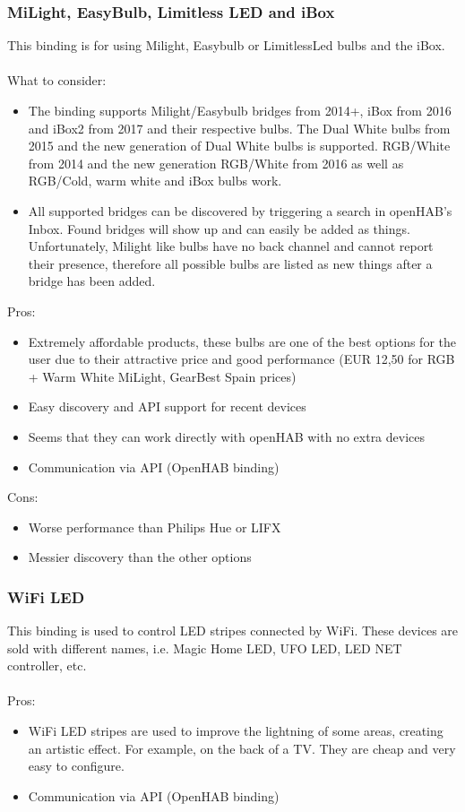 \subsubsection{MiLight, EasyBulb, Limitless LED and iBox}
This binding is for using Milight, Easybulb or LimitlessLed bulbs and the iBox.\\~\\
What to consider:
\begin{itemize}
	\item The binding supports Milight/Easybulb bridges from 2014+, iBox from 2016 and iBox2 from 2017 and their respective bulbs.
	The Dual White bulbs from 2015 and the new generation of Dual White bulbs is supported. RGB/White from 2014 and the 
	new generation RGB/White from 2016 as well as RGB/Cold, warm white and iBox bulbs work.
	\item All supported bridges can be discovered by triggering a search in openHAB’s Inbox. Found bridges will show up and can
	easily be added as things. Unfortunately, Milight like bulbs have no back channel and cannot report their presence, therefore all 
	possible bulbs are listed as new things after a bridge has been added.
\end{itemize}
Pros:
\begin{itemize}
	\item Extremely affordable products, these bulbs are one of the best options for the user due to their attractive price and good 
	performance (EUR 12,50 for RGB + Warm White MiLight, GearBest Spain prices)
	\item Easy discovery and API support for recent devices
	\item Seems that they can work directly with openHAB with no extra devices
	\item Communication via API (OpenHAB binding)
\end{itemize}
Cons:
\begin{itemize}
	\item Worse performance than Philips Hue or LIFX
	\item Messier discovery than the other options
\end{itemize}

\subsubsection{WiFi LED}
This binding is used to control LED stripes connected by WiFi. These devices are sold with different names, i.e. Magic Home LED, 
UFO LED, LED NET controller, etc.\\~\\
Pros:
\begin{itemize}
	\item WiFi LED stripes are used to improve the lightning of some areas, creating an artistic effect. For example, on the back of a
	TV. They are cheap and very easy to configure.
	\item Communication via API (OpenHAB binding)
\end{itemize}

